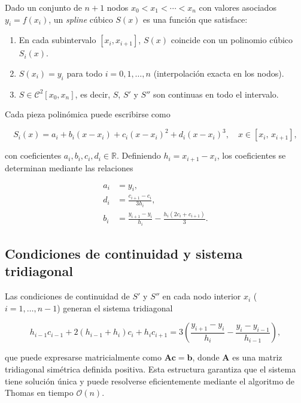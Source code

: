 \documentclass[conference]{IEEEtran}
\begin{document}
Dado un conjunto de $n+1$ nodos $x_0 < x_1 < \cdots < x_n$ con valores asociados $y_i = f(x_i)$, un \textit{spline} cúbico $S(x)$ es una función que
satisface:

\begin{enumerate}
    \item En cada subintervalo $[x_i, x_{i+1}]$, $S(x)$ coincide con un polinomio cúbico $S_i(x)$.

    \item $S(x_i) = y_i$ para todo $i = 0, 1, \ldots, n$ (interpolación exacta en los nodos).

    \item $S \in \mathcal{C}^2[x_0, x_n]$, es decir, $S$, $S'$ y $S''$ son continuas en todo el intervalo.
\end{enumerate}

Cada pieza polinómica puede escribirse como

\begin{equation}
S_i(x) = a_i + b_i(x - x_i) + c_i(x - x_i)^2 + d_i(x - x_i)^3,
\quad x \in [x_i,\, x_{i+1}],
\label{eq:spline_piece}
\end{equation}

\noindent con coeficientes $a_i, b_i, c_i, d_i \in \mathbb{R}$. Definiendo $h_i = x_{i+1} - x_i$, los coeficientes se determinan mediante las relaciones

\begin{align}
a_i &= y_i, \label{eq:coef_a}\\
d_i &= \frac{c_{i+1} - c_i}{3h_i}, \label{eq:coef_d}\\
b_i &= \frac{y_{i+1} - y_i}{h_i} - \frac{h_i(2c_i + c_{i+1})}{3}.
\label{eq:coef_b}
\end{align}

\subsection{Condiciones de continuidad y sistema tridiagonal}

Las condiciones de continuidad de $S'$ y $S''$ en cada nodo interior $x_i$ ($i = 1, \ldots, n-1$) generan el sistema tridiagonal

\begin{equation}
h_{i-1}c_{i-1} + 2(h_{i-1}+h_i)c_i + h_i c_{i+1}
= 3\!\left(\frac{y_{i+1}-y_i}{h_i} -
           \frac{y_i - y_{i-1}}{h_{i-1}}\right),
\label{eq:tridiagonal}
\end{equation}

\noindent que puede expresarse matricialmente como $\mathbf{A}\mathbf{c} = \mathbf{b}$, donde $\mathbf{A}$ es una matriz tridiagonal simétrica definida
positiva. Esta estructura garantiza que el sistema tiene solución única y puede resolverse eficientemente mediante el algoritmo de Thomas en tiempo
$\mathcal{O}(n)$.
\end{document}
